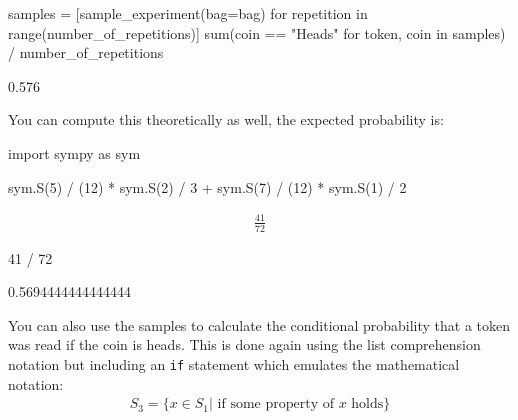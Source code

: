 \begin{pyin}
samples = [sample_experiment(bag=bag) for repetition in range(number_of_repetitions)]
sum(coin == "Heads" for token, coin in samples) / number_of_repetitions
\end{pyin}





\begin{raw}
0.576
\end{raw}






You can compute this theoretically as well, the expected probability is:




\begin{pyin}
import sympy as sym

sym.S(5) / (12) * sym.S(2) / 3 + sym.S(7) / (12) * sym.S(1) / 2
\end{pyin}




\begin{equation*}
\begin{split}\displaystyle \frac{41}{72}\end{split}
\end{equation*}







\begin{pyin}
41 / 72
\end{pyin}





\begin{raw}
0.5694444444444444
\end{raw}






You can also use the samples to calculate the conditional probability that a
token was read if the coin is heads. This is done again using the list
comprehension notation but including an \texttt{if} statement which 
emulates the mathematical notation:
\begin{equation*}
\begin{split}
    S_3 = \{x \in S_1  | \text{ if some property of \(x\) holds}\}
\end{split}
\end{equation*}




